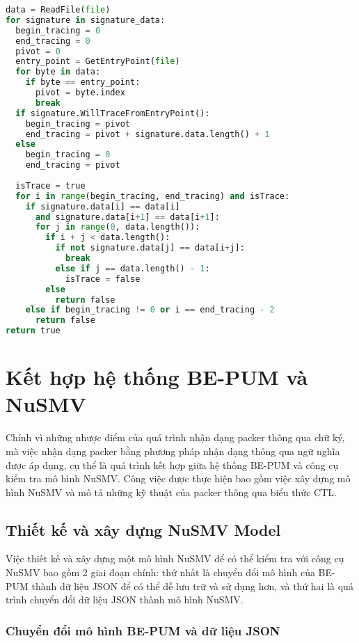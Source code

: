 \begin{code}
\begin{lstlisting}[captionpos=b,caption={Giải thuật nhận dạng packer thông qua chữ ký},label={lst:SignatureAlgo},frame=single,language=Python]
data = ReadFile(file)
for signature in signature_data:
  begin_tracing = 0
  end_tracing = 0
  pivot = 0
  entry_point = GetEntryPoint(file)
  for byte in data:
    if byte == entry_point:
      pivot = byte.index
      break
  if signature.WillTraceFromEntryPoint():
    begin_tracing = pivot
    end_tracing = pivot + signature.data.length() + 1
  else
    begin_tracing = 0
    end_tracing = pivot
	
  isTrace = true
  for i in range(begin_tracing, end_tracing) and isTrace:
    if signature.data[i] == data[i] 
      and signature.data[i+1] == data[i+1]:
      for j in range(0, data.length()):
        if i + j < data.length():
          if not signature.data[j] == data[i+j]:
            break
          else if j == data.length() - 1:
            isTrace = false
        else
          return false
    else if begin_tracing != 0 or i == end_tracing - 2 
      return false
return true
\end{lstlisting}
\end{code}

\section{Kết hợp hệ thống BE-PUM và NuSMV}

\hspace{0.5cm}Chính vì những nhược điểm của quá trình nhận dạng packer thông qua chữ ký, mà việc nhận dạng packer bằng phương pháp nhận dạng thông qua ngữ nghĩa được áp dụng, cụ thể là quá trình kết hợp giữa hệ thống BE-PUM và công cụ kiểm tra mô hình NuSMV. Công việc được thực hiện bao gồm việc xây dựng mô hình NuSMV và mô tả những kỹ thuật của packer thông qua biểu thức CTL.

\subsection{Thiết kế và xây dựng NuSMV Model}
\hspace{0.5cm}Việc thiết kế và xây dựng một mô hình NuSMV để có thể kiểm tra với công cụ NuSMV bao gồm 2 giai đoạn chính: thứ nhất là chuyển đổi mô hình của BE-PUM thành dữ liệu JSON để có thể dễ lưu trữ và sử dụng hơn, và thứ hai là quá trình chuyển đổi dữ liệu JSON thành mô hình NuSMV.

\subsubsection{Chuyển đổi mô hình BE-PUM và dữ liệu JSON}

